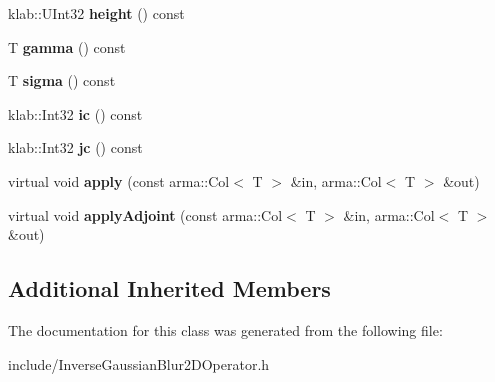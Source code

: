 \begin{DoxyCompactItemize}
\item 
klab\+::\+U\+Int32 {\bfseries height} () const \hypertarget{classkl1p_1_1TInverseGaussianBlur2DOperator_a824562b56649f8e19cf76a85342b6fc0}{}\label{classkl1p_1_1TInverseGaussianBlur2DOperator_a824562b56649f8e19cf76a85342b6fc0}

\item 
T {\bfseries gamma} () const \hypertarget{classkl1p_1_1TInverseGaussianBlur2DOperator_af5f387a0484a39c2836e8cbaf9390350}{}\label{classkl1p_1_1TInverseGaussianBlur2DOperator_af5f387a0484a39c2836e8cbaf9390350}

\item 
T {\bfseries sigma} () const \hypertarget{classkl1p_1_1TInverseGaussianBlur2DOperator_a5cea8e67bfea67eefd9ff7ca323a5fba}{}\label{classkl1p_1_1TInverseGaussianBlur2DOperator_a5cea8e67bfea67eefd9ff7ca323a5fba}

\item 
klab\+::\+Int32 {\bfseries ic} () const \hypertarget{classkl1p_1_1TInverseGaussianBlur2DOperator_a6c50b45edea8a52ae286d7c3189e82f9}{}\label{classkl1p_1_1TInverseGaussianBlur2DOperator_a6c50b45edea8a52ae286d7c3189e82f9}

\item 
klab\+::\+Int32 {\bfseries jc} () const \hypertarget{classkl1p_1_1TInverseGaussianBlur2DOperator_a58dc67f63867ad4a6508115d841db6b8}{}\label{classkl1p_1_1TInverseGaussianBlur2DOperator_a58dc67f63867ad4a6508115d841db6b8}

\item 
virtual void {\bfseries apply} (const arma\+::\+Col$<$ T $>$ \&in, arma\+::\+Col$<$ T $>$ \&out)\hypertarget{classkl1p_1_1TInverseGaussianBlur2DOperator_a071c409fc329ae970b62a2cb7c48ddc1}{}\label{classkl1p_1_1TInverseGaussianBlur2DOperator_a071c409fc329ae970b62a2cb7c48ddc1}

\item 
virtual void {\bfseries apply\+Adjoint} (const arma\+::\+Col$<$ T $>$ \&in, arma\+::\+Col$<$ T $>$ \&out)\hypertarget{classkl1p_1_1TInverseGaussianBlur2DOperator_aa0c659414c2c826880254c022e3b430a}{}\label{classkl1p_1_1TInverseGaussianBlur2DOperator_aa0c659414c2c826880254c022e3b430a}

\end{DoxyCompactItemize}
\subsection*{Additional Inherited Members}


The documentation for this class was generated from the following file\+:\begin{DoxyCompactItemize}
\item 
include/Inverse\+Gaussian\+Blur2\+D\+Operator.\+h\end{DoxyCompactItemize}
